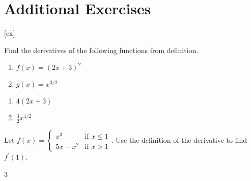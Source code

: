 \section{Additional Exercises}\label{sec:MoreFunctionExercises}

[ex]

\begin{enumialphparenastyle}

\begin{ex}
Find the derivatives of the following functions
from definition.
\begin{enumerate}
	\item	$f(x)=(2x+3)^2$
	\item	$g(x)=x^{3/2}$
\end{enumerate}
\begin{sol}
\begin{enumerate}
	\item	$4(2x+3)$
	\item	$\frac{3}{2}x^{1/2}$
\end{enumerate}
\end{sol}
\end{ex}

\begin{ex}
Let $f(x)=\left\{ 
\begin{array}{cc}
x^{3} & \text{if }x\leq 1 \\ 
5x-x^{2} & \text{if }x>1%
\end{array}%
\right. .$
Use the definition of the derivative to find $f^{\prime}(1)$.
\begin{sol}
	3
\end{sol}
\end{ex}


\end{enumialphparenastyle}
